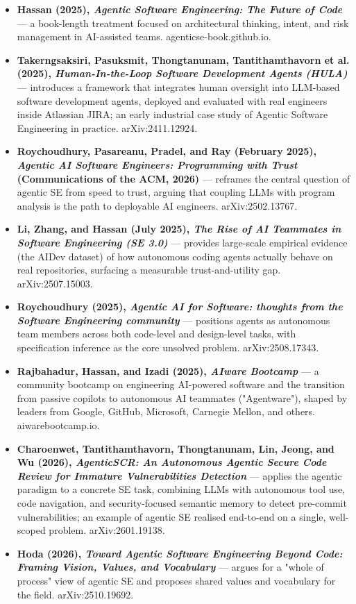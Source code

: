 \documentclass[11pt,a4paper]{book}
\begin{document}
\begin{itemize}
  \item \textbf{Hassan (2025), \textit{Agentic Software Engineering: The Future of Code}} --- a book-length treatment focused on architectural thinking, intent, and risk management in AI-assisted teams. agenticse-book.github.io.
  \item \textbf{Takerngsaksiri, Pasuksmit, Thongtanunam, Tantithamthavorn et al. (2025), \textit{Human-In-the-Loop Software Development Agents (HULA)}} --- introduces a framework that integrates human oversight into LLM-based software development agents, deployed and evaluated with real engineers inside Atlassian JIRA; an early industrial case study of Agentic Software Engineering in practice. arXiv:2411.12924.
  \item \textbf{Roychoudhury, Pasareanu, Pradel, and Ray (February 2025), \textit{Agentic AI Software Engineers: Programming with Trust} (Communications of the ACM, 2026)} --- reframes the central question of agentic SE from speed to trust, arguing that coupling LLMs with program analysis is the path to deployable AI engineers. arXiv:2502.13767.
  \item \textbf{Li, Zhang, and Hassan (July 2025), \textit{The Rise of AI Teammates in Software Engineering (SE 3.0)}} --- provides large-scale empirical evidence (the AIDev dataset) of how autonomous coding agents actually behave on real repositories, surfacing a measurable trust-and-utility gap. arXiv:2507.15003.
  \item \textbf{Roychoudhury (2025), \textit{Agentic AI for Software: thoughts from the Software Engineering community}} --- positions agents as autonomous team members across both code-level and design-level tasks, with specification inference as the core unsolved problem. arXiv:2508.17343.
  \item \textbf{Rajbahadur, Hassan, and Izadi (2025), \textit{AIware Bootcamp}} --- a community bootcamp on engineering AI-powered software and the transition from passive copilots to autonomous AI teammates ("Agentware"), shaped by leaders from Google, GitHub, Microsoft, Carnegie Mellon, and others. aiwarebootcamp.io.
  \item \textbf{Charoenwet, Tantithamthavorn, Thongtanunam, Lin, Jeong, and Wu (2026), \textit{AgenticSCR: An Autonomous Agentic Secure Code Review for Immature Vulnerabilities Detection}} --- applies the agentic paradigm to a concrete SE task, combining LLMs with autonomous tool use, code navigation, and security-focused semantic memory to detect pre-commit vulnerabilities; an example of agentic SE realised end-to-end on a single, well-scoped problem. arXiv:2601.19138.
  \item \textbf{Hoda (2026), \textit{Toward Agentic Software Engineering Beyond Code: Framing Vision, Values, and Vocabulary}} --- argues for a "whole of process" view of agentic SE and proposes shared values and vocabulary for the field. arXiv:2510.19692.
\end{itemize}
\end{document}
